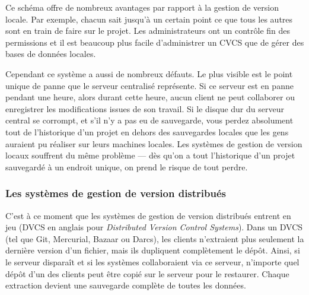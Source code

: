 Ce schéma offre de nombreux avantages par rapport à la gestion de version locale.
Par exemple, chacun sait jusqu'à un certain point ce que tous les autres sont en train de faire sur le projet.
Les administrateurs ont un contrôle fin des permissions et il est beaucoup plus facile d'administrer un CVCS que de gérer des bases de données locales.

Cependant ce système a aussi de nombreux défauts.
Le plus visible est le point unique de panne que le serveur centralisé représente.
Si ce serveur est en panne pendant une heure, alors durant cette heure, aucun client ne peut collaborer ou enregistrer les modifications issues de son travail.
Si le disque dur du serveur central se corrompt, et s'il n'y a pas eu de sauvegarde, vous perdez absolument tout de l'historique d'un projet en dehors des sauvegardes locales que les gens auraient pu réaliser sur leurs machines locales.
Les systèmes de gestion de version locaux souffrent du même problème  --- dès qu'on a tout l'historique d'un projet sauvegardé à un endroit unique, on prend le risque de tout perdre.

\subsubsection{Les systèmes de gestion de version distribués}

C'est à ce moment que les systèmes de gestion de version distribués entrent en jeu (DVCS en anglais pour \emph{Distributed Version Control Systems}).
Dans un DVCS (tel que Git, Mercurial, Bazaar ou Darcs), les clients n'extraient plus seulement la dernière version d'un fichier, mais ils dupliquent complètement le dépôt.
Ainsi, si le serveur disparaît et si les systèmes collaboraient via ce serveur, n'importe quel dépôt d'un des clients peut être copié sur le serveur pour le restaurer.
Chaque extraction devient une sauvegarde complète de toutes les données.

